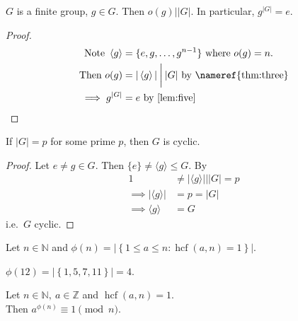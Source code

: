 \begin{corollary}
\protect\hypertarget{cor:two}{}\label{cor:two}
$G$ is a finite group, $g \in G$.
Then $o(g) \mathbin{\bigg|} |G|$.
In particular, $g^{|G|} = e$.
\end{corollary}

\begin{proof}
\begin{align*}
    \text{Note } \left\langle g\right\rangle &= \{ e, g, \dots, g^{n-1} \} \text{ where } o(g) = n. \\
    \text{Then } o(g) &= |\left\langle g\right\rangle| \mathbin{\bigg|} |G| \text{ by \nameref{thm:three}} \\
    \implies g^{|G|} &= e \text{ by \Cref{lem:five}}
\end{align*}
\end{proof}

\begin{corollary}
\protect\hypertarget{cor:three}{}\label{cor:three}
If $|G| = p$ for some prime $p$, then $G$ is cyclic.
\end{corollary}

\begin{proof}
Let $e \neq g \in G$.
Then $\{ e \} \neq \langle g \rangle \leq G$.
By 
\begin{align*}
    1 &\neq |\langle g \rangle| \mathbin{\bigg|} |G| = p \\
    \implies | \langle g \rangle | &= p = |G| \\
    \implies \langle g \rangle &= G
\end{align*}
i.e.~$G$ cyclic.
\end{proof}

\begin{definition}
    Let $n \in \mathbb{N}$ and $\phi(n) = \left| \left\{ 1 \leq a \leq n : \operatorname{hcf}(a, n) = 1 \right\} \right|$. 
\end{definition} 

\begin{example}
    $\phi(12) = \left| \left\{ 1, 5, 7, 11 \right\} \right| = 4$.
\end{example} 

\begin{theorem}
\protect\hypertarget{thm:four}{}\label{thm:four}Let $n \in \mathbb{N},\ a \in \mathbb{Z}$ and $\operatorname{hcf}(a, n) = 1$.\\
Then $a^{\phi(n)} \equiv 1 \pmod n$.
\end{theorem}

